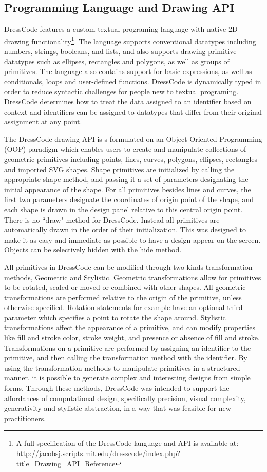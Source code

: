\documentclass{sigchi}
\begin{document}
\subsection{Programming Language and Drawing API}
DressCode features a custom textual programing language with native 2D drawing functionality\footnote{A full specification of the DressCode language and API is available at: \url{http://jacobsj.scripts.mit.edu/dresscode/index.php?title=Drawing_API_Reference}}. The language supports conventional datatypes including numbers, strings, booleans, and lists, and also supports drawing primitive datatypes such as ellipses, rectangles and polygons, as well as groups of primitives. The language also contains support for basic expressions, as well as conditionals, loops and user-defined functions. DressCode is dynamically typed in order to reduce syntactic challenges for people new to textual programing. DressCode determines how to treat the data assigned to an identifier based on context and identifiers can be assigned to datatypes that differ from their original assignment at any point. 

The DressCode drawing API is s formulated on an Object Oriented Programming (OOP) paradigm which enables users to create and manipulate collections of geometric primitives including points, lines, curves, polygons, ellipses, rectangles and imported SVG shapes. Shape primitives are initialized by calling the appropriate shape method, and passing it a set of parameters designating the initial appearance of the shape. For all primitives besides lines and curves, the first two parameters designate the coordinates of origin point of the shape, and each shape is drawn in the design panel relative to this central origin point. There is no ``draw" method for DressCode. Instead all primitives are automatically drawn in the order of their initialization. This was designed to make it as easy and immediate as possible to have a design appear on the screen. Objects can be selectively hidden with the hide method. 
 
All primitives in DressCode can be modified through two kinds transformation methods, Geometric and Stylistic. Geometric transformations allow  for primitives to be rotated, scaled or moved or combined with other shapes. All geometric transformations are performed relative to the origin of the primitive, unless otherwise specified. Rotation statements for example have an optional third parameter which specifies a point to rotate the shape around. Stylistic transformations affect the appearance of a primitive, and can modify properties like fill and stroke color, stroke weight, and presence or absence of fill and stroke. Transformations on a primitive are performed by assigning an identifier to the primitive, and then calling the transformation method with the identifier. By using the transformation methods to manipulate primitives in a structured manner, it is possible to generate complex and interesting designs from simple forms. Through these methods, DressCode was intended to support the affordances of computational design, specifically precision, visual complexity, generativity and stylistic abstraction, in a way that was feasible for new practitioners.
\end{document}
